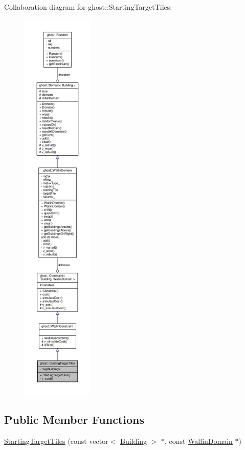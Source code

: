 Collaboration diagram for ghost\-:\-:Starting\-Target\-Tiles\-:\nopagebreak
\begin{figure}[H]
\begin{center}
\leavevmode
\includegraphics[height=550pt]{classghost_1_1StartingTargetTiles__coll__graph}
\end{center}
\end{figure}
\subsection*{Public Member Functions}
\begin{DoxyCompactItemize}
\item 
\hyperlink{classghost_1_1StartingTargetTiles_a6c2b6cf28fb668cfe7909396679d2587}{Starting\-Target\-Tiles} (const vector$<$ \hyperlink{classghost_1_1Building}{Building} $>$ $\ast$, const \hyperlink{classghost_1_1WallinDomain}{Wallin\-Domain} $\ast$)
\end{DoxyCompactItemize}
